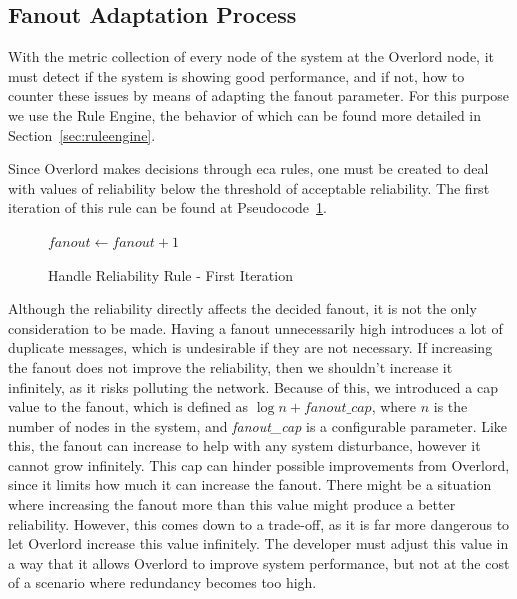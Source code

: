 \subsection{Fanout Adaptation Process}
\label{ssec:fanout_adaptation_process}

With the metric collection of every node of the system at the Overlord node, it must detect if the system is showing good performance, and if not, how to counter these issues by means of adapting the fanout parameter. For this purpose we use the Rule Engine, the behavior of which can be found more detailed in Section~\ref{sec:ruleengine}.

Since Overlord makes decisions through \gls{eca} rules, one must be created to deal with values of reliability below the threshold of acceptable reliability. The first iteration of this rule can be found at Pseudocode~\ref{code:reliabilityv1}.
\begin{figure}[ht]
    \centering
    \begin{algorithm}[H]
        \caption{Handle Reliability Rule - First Iteration}
        \label{code:reliabilityv1}
        \begin{algorithmic}
                \STATE $\textit{fanout} \gets \textit{fanout} + 1$
            \ENDIF
        \end{algorithmic}
    \end{algorithm}
\end{figure}

Although the reliability directly affects the decided fanout, it is not the only consideration to be made. Having a fanout unnecessarily high introduces a lot of duplicate messages, which is undesirable if they are not necessary. If increasing the fanout does not improve the reliability, then we shouldn't increase it infinitely, as it risks polluting the network. Because of this, we introduced a cap value to the fanout, which is defined as $\log{n} + \textit{fanout\_cap}$, where $n$ is the number of nodes in the system, and \textit{fanout\_cap} is a configurable parameter. Like this, the fanout can increase to help with any system disturbance, however it cannot grow infinitely. This cap can hinder possible improvements from Overlord, since it limits how much it can increase the fanout. There might be a situation where increasing the fanout more than this value might produce a better reliability. However, this comes down to a trade-off, as it is far more dangerous to let Overlord increase this value infinitely. The developer must adjust this value in a way that it allows Overlord to improve system performance, but not at the cost of a scenario where redundancy becomes too high.

